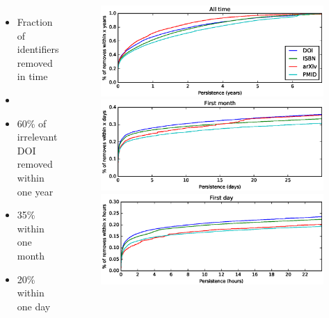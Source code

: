 \documentclass{beamer}
\begin{document}
\begin{frame}
    \begin{columns}[c]
        \begin{itemize}
            \item Fraction of identifiers removed in time %
            \item[]
            \item 60\% of irrelevant DOI removed within one year
            \item 35\% within one month
            \item 20\% within one day
        \end{itemize}
        \begin{figure}
        \centering
        \includegraphics[width=1\textwidth]{assets/irrelevant_identifiers_persistence_cdf_max_slides}

        \includegraphics[width=1\textwidth]{assets/irrelevant_identifiers_persistence_cdf_1month_slides}

        \includegraphics[width=1\textwidth]{assets/irrelevant_identifiers_persistence_cdf_1day_slides}
        \end{figure}
    \end{columns}
\end{frame}
\end{document}
